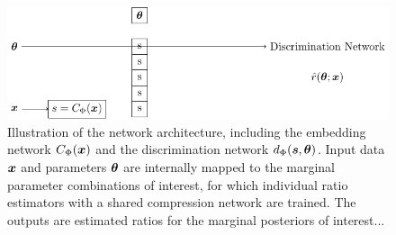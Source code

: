 \begin{figure}
    \centering
	\includegraphics[width=\linewidth]{TikZ/sbi_nn.pdf}
    \caption{ Illustration of the network architecture, including the embedding network $C_\Phi(\bm{x})$ and the discrimination network $d_\Phi(\boldsymbol{s}, \bm{\theta})$. Input data $\bm{x}$ and parameters $\bm{\theta}$ are internally mapped to the marginal parameter combinations of interest, for which individual ratio estimators with a shared compression network are trained. The outputs are estimated ratios for the marginal posteriors of interest... }
    \label{fig:sbi-nn}
\end{figure}

\medskip

